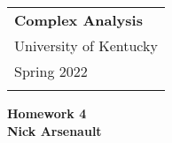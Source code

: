 \documentclass[a4paper,12pt]{article} %
\theoremstyle{plain}
\theoremstyle{definition}
\begin{document}
\thispagestyle{empty} %
\begin{tabular}{p{15.5cm}} %
{\large \bf Complex Analysis} \\
University of Kentucky \\ Spring 2022 \\
\hline %
\\
\end{tabular} %

\vspace*{0.3cm} %

\begin{center} %
  {\Large \bf Homework 4} %
	\vspace{2mm} \\
  \textbf{Nick Arsenault}
\end{center}  
\vspace{0.4cm}
\end{document}
